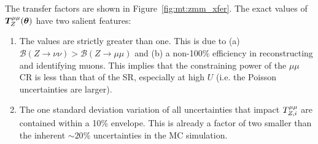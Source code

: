The transfer factors are shown in Figure~\ref{fig:mt:zmm_xfer}.  
The exact values of $\bm{T}^{\mu\mu}_{Z}(\bm\theta)$ have two salient features:
\begin{enumerate}
    \item The values are strictly greater than one. 
        This is due to (a) $\mathcal{B}(Z\rightarrow\nu\nu)>\mathcal{B}(Z\rightarrow\mu\mu)$ and (b) a non-100\% efficiency in reconstructing and identifying muons. 
        This implies that the constraining power of the $\mu\mu$ CR is less than that of the SR, especially at high $U$ (i.e. the Poisson uncertainties are larger). 
    \item The one standard deviation variation of all uncertainties that impact ${T}^{\mu\mu}_{Z,i}$ are contained within a 10\% envelope. 
        This is already a factor of two smaller than the inherent $\sim20\%$ uncertainties in the MC simulation.
\end{enumerate}

